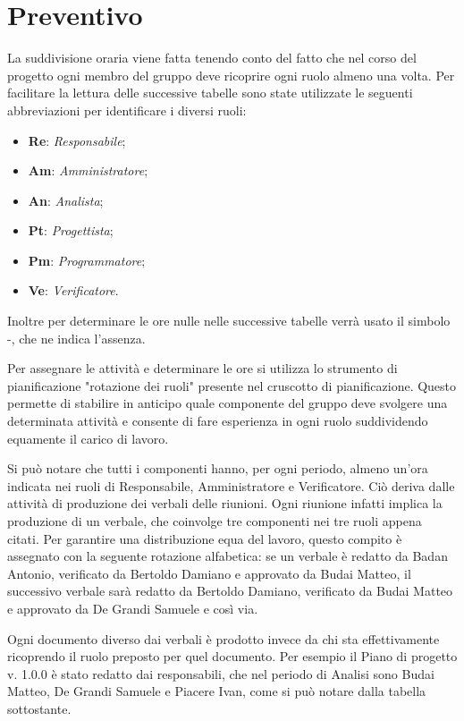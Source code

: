 \section{Preventivo}
La suddivisione oraria viene fatta tenendo conto del fatto che nel corso del progetto ogni  membro del gruppo deve ricoprire ogni ruolo almeno una volta.
Per facilitare la lettura delle successive tabelle sono state utilizzate le seguenti abbreviazioni per identificare i diversi ruoli:
\begin{itemize}
	\item \textbf{Re}: \textit{Responsabile};
	\item \textbf{Am}: \textit{Amministratore};
	\item \textbf{An}: \textit{Analista};
	\item \textbf{Pt}: \textit{Progettista};
	\item \textbf{Pm}: \textit{Programmatore};
	\item \textbf{Ve}: \textit{Verificatore}.
\end{itemize}
Inoltre per determinare le ore nulle nelle successive tabelle verrà usato il simbolo -, che ne indica l'assenza.

Per assegnare le attività e determinare le ore si utilizza lo strumento di pianificazione "rotazione dei ruoli" presente nel cruscotto di pianificazione.
Questo permette di stabilire in anticipo quale componente del gruppo deve svolgere una determinata attività e consente di fare esperienza in ogni ruolo suddividendo equamente il carico di lavoro. 

Si può notare che tutti i componenti hanno, per ogni periodo, almeno un'ora indicata nei ruoli di Responsabile, Amministratore e Verificatore. Ciò deriva dalle attività di produzione dei verbali delle riunioni. Ogni riunione infatti implica la produzione di un verbale, che coinvolge tre componenti nei tre ruoli appena citati. Per garantire una distribuzione equa del lavoro, questo compito è assegnato con la seguente rotazione alfabetica: se un verbale è redatto da Badan Antonio, verificato da Bertoldo Damiano e approvato da Budai Matteo, il successivo verbale sarà redatto da Bertoldo Damiano, verificato da Budai Matteo e approvato da De Grandi Samuele e così via.

Ogni documento diverso dai verbali è prodotto invece da chi sta effettivamente ricoprendo il ruolo preposto per quel documento. Per esempio il Piano di progetto v. 1.0.0 è stato redatto dai responsabili, che nel periodo di Analisi sono Budai Matteo, De Grandi Samuele e Piacere Ivan, come si può notare dalla tabella sottostante. 

